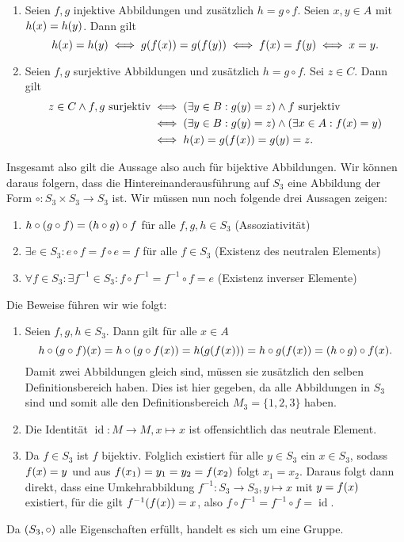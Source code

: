 \documentclass[german,12pt]{homework}
\DeclareMathOperator{\id}{id}
\DeclarePairedDelimiter{\enbrace}{(}{)}
\begin{document}
    \begin{enumerate}
        \item Seien \(f, g\) injektive Abbildungen und zusätzlich \(h = g \circ f\). Seien \(x, y \in A\) mit \(h\enbrace*{x} = h\enbrace*{y}\). Dann gilt
        \[h\enbrace*{x} = h\enbrace*{y} \iff g\enbrace*{f\enbrace*{x}} = g\enbrace*{f\enbrace*{y}} \iff f\enbrace*{x} = f\enbrace*{y} \iff x = y.\]
        \item Seien \(f, g\) surjektive Abbildungen und zusätzlich \(h = g \circ f\). Sei \(z \in C\). Dann gilt
        \begin{align*}
            z \in C \land f,g\text{ surjektiv} &\iff \enbrace*{{\exists}y \in B: g\enbrace*{y} = z} \land f \text{ surjektiv}\\
            &\iff \enbrace*{{\exists}y \in B: g\enbrace*{y} = z} \land \enbrace*{{\exists}x \in A: f\enbrace*{x} = y}\\
            &\iff h\enbrace*{x} = g\enbrace*{f\enbrace*{x}} = g\enbrace*{y} = z.
        \end{align*}
    \end{enumerate}
    Insgesamt also gilt die Aussage also auch für bijektive Abbildungen. Wir können daraus folgern, dass die Hintereinanderausführung auf \(S_3\) eine Abbildung der Form \(\circ: S_3 \times S_3 \to S_3\) ist. Wir müssen nun noch folgende drei Aussagen zeigen:
    \begin{enumerate}
        \item \(h \circ \enbrace*{g \circ f} = \enbrace*{h \circ g} \circ f\) für alle \(f, g, h \in S_3\) (Assoziativität)
        \item \({\exists}e \in S_3: e \circ f = f \circ e = f\) für alle \(f \in S_3\) (Existenz des neutralen Elements)
        \item \({\forall}f \in S_3: {\exists}f^{-1} \in S_3: f \circ f^{-1} = f^{-1} \circ f = e\) (Existenz inverser Elemente)
    \end{enumerate}
    Die Beweise führen wir wie folgt:
    \begin{enumerate}
        \item Seien \(f,g, h \in S_3\). Dann gilt für alle \(x \in A\)
        \[h \circ \enbrace*{g \circ f}\enbrace*{x} = h \circ \enbrace*{g \circ f\enbrace*{x}} = h\enbrace*{g\enbrace*{f\enbrace*{x}}} = h \circ g\enbrace*{f\enbrace*{x}} = \enbrace*{h \circ g} \circ f\enbrace*{x}.\]
        Damit zwei Abbildungen gleich sind, müssen sie zusätzlich den selben Definitionsbereich haben. Dies ist hier gegeben, da alle Abbildungen in \(S_3\) sind und somit alle den Definitionsbereich \(M_3 = \{1, 2, 3\}\) haben.
        \item Die Identität \(\id: M \to M, x \mapsto x\) ist offensichtlich das neutrale Element.
        \item Da \(f \in S_3\) ist \(f\) bijektiv. Folglich existiert für alle \(y \in S_3\) ein \(x \in S_3\), sodass \(f\enbrace*{x} = y\) und aus \(f\enbrace*{x_1} = y_1 = y_2 = f\enbrace*{x_2}\) folgt \(x_1 = x_2\). Daraus folgt dann direkt, dass eine Umkehrabbildung \(f^{-1}: S_3 \to S_3, y \mapsto x\) mit \(y = f\enbrace*{x}\) existiert, für die gilt \(f^{-1}\enbrace*{f\enbrace*{x}} = x\), also \(f \circ f^{-1} = f^{-1} \circ f = \id\).
    \end{enumerate}
    Da \(\enbrace*{S_3, \circ}\) alle Eigenschaften erfüllt, handelt es sich um eine Gruppe.
  
\end{document}
